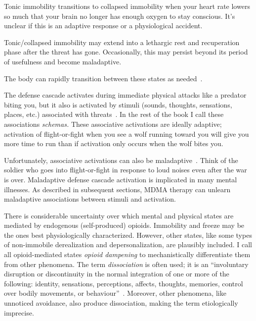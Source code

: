 \documentclass[11pt,oneside]{book}
\let\cite\parencite
\begin{document}
\begin{description}
    Tonic immobility transitions to collapsed immobility when your heart rate lowers so much that your brain no longer has enough oxygen to stay conscious. It's unclear if this is an adaptive response or a physiological accident.

    \item[Quiescent Immobility] Tonic/collapsed immobility may extend into a lethargic rest and recuperation phase after the threat has gone. Occasionally, this may persist beyond its period of usefulness and become maladaptive.
\end{description}

The body can rapidly transition between these states as needed~\cite{kozlowskaDefenseCascade}.

The defense cascade activates during immediate physical attacks like a predator biting you, but it also is activated by stimuli (sounds, thoughts, sensations, places, etc.) associated with threats~\cite{kozlowskaDefenseCascade}. In the rest of the book I call these associations \textit{schemas.} These associative activations are ideally adaptive; activation of flight-or-fight when you see a wolf running toward you will give you more time to run than if activation only occurs when the wolf bites you.

Unfortunately, associative activations can also be maladaptive~\cite{kozlowskaDefenseCascade}. Think of the soldier who goes into flight-or-fight in response to loud noises even after the war is over. Maladaptive defense cascade activation is implicated in many mental illnesses. As described in subsequent sections, MDMA therapy can unlearn maladaptive associations between stimuli and activation.

There is considerable uncertainty over which mental and physical states are mediated by endogenous (self-produced) opioids. Immobility and freeze may be the ones best physiologically characterized. However, other states, like some types of non-immobile derealization and depersonalization, are plausibly included. I call all opioid-mediated states \textit{opioid dampening} to mechanistically differentiate them from other phenomena. The term \textit{dissociation} is often used; it is an \enquote{involuntary disruption or discontinuity in the normal integration of one or more of the following: identity, sensations, perceptions, affects, thoughts, memories, control over bodily movements, or behaviour}~\cite[sec. Dissociative disorders]{icd11}. Moreover, other phenomena, like unnoticed avoidance, also produce dissociation, making the term etiologically imprecise.
\end{document}
